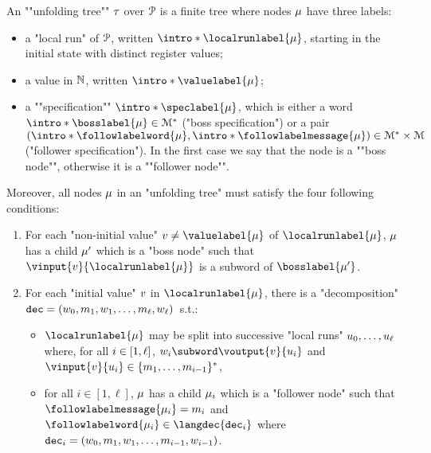 \begin{definition}
\label{def:unfolding_tree}
\AP An ""unfolding tree"" $\tau$ over $\mathcal{P}$ is
a finite tree where nodes $\mu$ have three labels:
\begin{itemize}
	\item a "local run" of $\mathcal{P}$, written $\intro*\localrunlabel{\node}$, starting in the initial state with distinct register values;
	
	\item a value in $\mathbb{N}$, written $\intro*\valuelabel{\node}$;
	
	\item a ""specification"" $\intro*\speclabel{\node}$, which is either a word $\intro*\bosslabel{\node} \in \messages^*$ ("boss specification") or a pair $(\intro*\followlabelword{\node}, \intro*\followlabelmessage{\node}) \in \messages^* \times \messages$ ("follower specification"). In the first case we say that the node is a ""boss node"", otherwise it is a ""follower node"".
\end{itemize} 
Moreover, all nodes $\mu$ in an "unfolding tree" must satisfy the four following conditions:
\begin{enumerate}[label= (\roman*), ref=(\roman*)]
	\item \label{item:condition1_non_initial_value} For each "non-initial value" $\aval \ne \valuelabel{\node}$ of $\localrunlabel{\node}$, $\mu$ has a child $\mu'$ which is a "boss node" such that $\vinput{\aval}{\localrunlabel{\node}}$ is a subword of $\bosslabel{\node'}$.
	
	\item \label{item:condition2_initial_value} For each "initial value" $v$ in $\localrunlabel{\node}$, there is a "decomposition" $\mathtt{dec} = (w_0, m_1, w_1, \ldots, m_{\ell}, w_{\ell})$~s.t.:
	\begin{itemize}
		\item $\localrunlabel{\node}$ may be split into successive "local runs" $u_0, \dots, u_{\ell}$ where, for all $i \in [1,\ell]$, $w_i \subword \voutput{\aval}{\localrun_i}$ and $\vinput{\aval}{\localrun_i} \in \set{m_1, \dots, m_{i-1}}^*$,
		\item for all $i \in [1,\ell]$, $\mu$ has a child $\mu_i$ which is a "follower node" such that $\followlabelmessage{\node_i} = m_i$ and $\followlabelword{\node_i} \in\langdec{\decsymb_i}$ where $\mathtt{dec}_i = (w_0, m_1, w_1, \ldots, m_{i-1}, w_{i-1})$.	\end{itemize}
	

\end{enumerate}
\end{definition}
